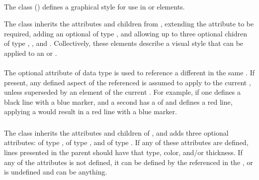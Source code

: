 \subsection{}
\label{class:style}

The \Style class () defines a graphical style for use in \Figure or \Plot elements.


The  class inherits the attributes and children from \SedBase, extending the  attribute to be required, adding an optional  of type \SIdRef, and allowing up to three optional chidren of type \Line, \Marker, and \Fill.  Collectively, these elements describe a visual style that can be applied to an \AbstractCurve or \Surface.

\paragraph*{}
The optional  attribute of data type \SIdRef is used to reference a different \Style in the same \SedDocument.  If present, any defined aspect of the referenced \Style is assumed to apply to the current \Style, unless superseded by an element of the current \Style.  For example, if one \Style {} defines a black line with a blue marker, and a second \Style {} has a  of  and defines a red line, applying a  would result in a red line with a blue marker.


\subsubsection{}
\label{class:line}

The \Line class inherits the attributes and children of \SedBase, and adds three optional attributes:  of type \LineType,  of type \SedColor, and  of type .  If any of these attributes are defined, lines presented in the parent \Style should have that type, color, and/or thickness.  If any of the attributes is not defined, it can be defined by the \Style referenced in the , or is undefined and can be anything.

\paragraph*{}


